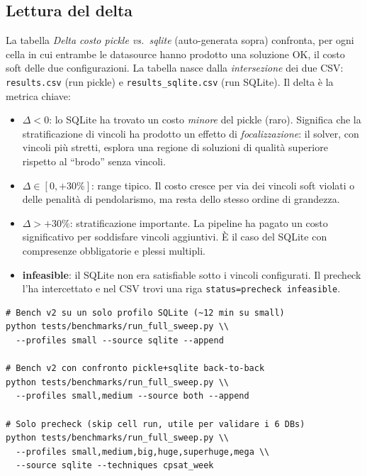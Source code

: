 \subsection{Lettura del delta}



La tabella \emph{Delta costo pickle vs.\ sqlite} (auto-generata
sopra) confronta, per ogni cella in cui entrambe le datasource
hanno prodotto una soluzione OK, il costo soft delle due
configurazioni. La tabella nasce dalla \emph{intersezione} dei
due CSV: \texttt{results.csv} (run pickle) e
\texttt{results\_sqlite.csv} (run SQLite). Il delta \`e la
metrica chiave:

\begin{itemize}
\item \textbf{$\Delta < 0$}: lo SQLite ha trovato un costo
  \emph{minore} del pickle (raro). Significa che la
  stratificazione di vincoli ha prodotto un effetto di
  \emph{focalizzazione}: il solver, con vincoli pi\`u stretti,
  esplora una regione di soluzioni di qualit\`a superiore
  rispetto al ``brodo'' senza vincoli.
\item \textbf{$\Delta \in [0, +30\%]$}: range tipico. Il costo
  cresce per via dei vincoli soft violati o delle penalit\`a di
  pendolarismo, ma resta dello stesso ordine di grandezza.
\item \textbf{$\Delta > +30\%$}: stratificazione importante.
  La pipeline ha pagato un costo significativo per soddisfare
  vincoli aggiuntivi. \`E il caso del SQLite con compresenze
  obbligatorie e plessi multipli.
\item \textbf{infeasible}: il SQLite non era satisfiable sotto
  i vincoli configurati. Il precheck l'ha intercettato e nel
  CSV trovi una riga \texttt{status=precheck infeasible}.
\end{itemize}

\begin{esempiobox}[title=Provalo subito]
\begin{lstlisting}[style=shell]
# Bench v2 su un solo profilo SQLite (~12 min su small)
python tests/benchmarks/run_full_sweep.py \\
  --profiles small --source sqlite --append

# Bench v2 con confronto pickle+sqlite back-to-back
python tests/benchmarks/run_full_sweep.py \\
  --profiles small,medium --source both --append

# Solo precheck (skip cell run, utile per validare i 6 DBs)
python tests/benchmarks/run_full_sweep.py \\
  --profiles small,medium,big,huge,superhuge,mega \\
  --source sqlite --techniques cpsat_week
\end{lstlisting}
\end{esempiobox}

